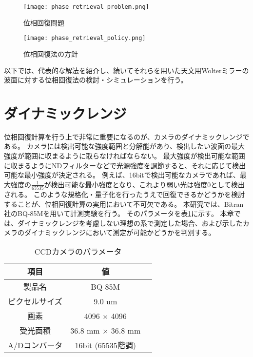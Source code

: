 \begin{figure}[!ht]
\centering
\texttt{[image: phase\_retrieval\_problem.png]}
\caption{位相回復問題}
\label{fig:phase_retrieval_problem}
\end{figure}

\begin{figure}[!ht]
\centering
\texttt{[image: phase\_retrieval\_policy.png]}
\caption{位相回復法の方針}
\label{fig:phase_retrieval_policy}
\end{figure}

以下では、代表的な解法を紹介し、続いてそれらを用いた天文用Wolterミラーの波面に対する位相回復法の検討・シミュレーションを行う。

\clearpage
\newpage

\section{ダイナミックレンジ}
位相回復計算を行う上で非常に重要になるのが、カメラのダイナミックレンジである。
カメラには検出可能な強度範囲と分解能があり、検出したい波面の最大強度が範囲に収まるように取らなければならない。
最大強度が検出可能な範囲に収まるようにNDフィルターなどで光源強度を調節すると、それに応じて検出可能な最小強度が決定される。
例えば、16bitで検出可能なカメラであれば、最大強度の$\frac{1}{65535}$が検出可能な最小強度となり、これより弱い光は強度0として検出される。
このような規格化・量子化を行ったうえで回復できるかどうかを検討することが、位相回復計算の実用において不可欠である。
本研究では、Bitran社のBQ-85Mを用いて計測実験を行う。
そのパラメータを表\ref{tb:ccd_camera_params}に示す。
本章では、ダイナミックレンジを考慮しない理想の系で測定した場合、および示したカメラのダイナミックレンジにおいて測定が可能かどうかを判別する。

\begin{table}[!ht]
\begin{center}
  \begin{tabular}{|c|c|l|} \hline
    項目 & 値 \\ \hline
    製品名 & BQ-85M \\
    ピクセルサイズ & 9.0 um \\
    画素 & 4096 $\times$ 4096 \\
    受光面積 & 36.8 mm $\times$ 36.8 mm \\
    A/Dコンバータ & 16bit (65535階調) \\ \hline
  \end{tabular}
  \caption{CCDカメラのパラメータ}
  \label{tb:ccd_camera_params}
\end{center}
\end{table}

